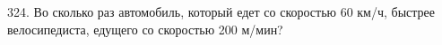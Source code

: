 324. Во сколько раз автомобиль, который едет со скоростью 60 км/ч, быстрее велосипедиста, едущего со скоростью 200 м/мин?\\
